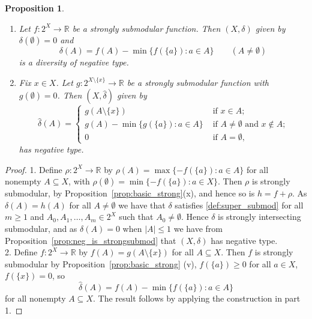 \documentclass{article}
\theoremstyle{plain}
\newtheorem{proposition}[theorem]{Proposition}
\theoremstyle{definition}
\newcommand{\whd}{\widehat{\delta}}
\renewcommand{\Re}{\mathbb{R}}
\begin{document}
\begin{proposition} \label{prop:extend_strong}
\begin{enumerate}
\item Let $f:2^X \rightarrow \Re$ be a strongly submodular function. Then $(X,\delta)$ given by $\delta(\emptyset) = 0$ and 
\[\delta(A) = f(A) - \min\{f(\{a\}): a \in A \} \quad \quad (A \neq \emptyset)\]
is a diversity of negative type.
\item Fix $x \in X$. Let $g:2^{X \setminus \{x\}} \rightarrow \Re$ be a strongly submodular function with $g(\emptyset) = 0$. Then $(X,\whd)$ given by 
\[
\whd(A) = \begin{cases} g(A \setminus \{x\}) & \mbox{ if $x \in A$;} \\
g(A) - \min\{g(\{a\}):a \in A\} & \mbox{ if $A \neq \emptyset$ and $x \not \in A$;} \\
0 & \mbox{ if $A = \emptyset$,} \end{cases}
\]
has negative type.
\end{enumerate}
\end{proposition}
\begin{proof}
1.  Define $\rho:2^X \rightarrow \Re$ by $\rho(A) = \max\{-f(\{a\}): a \in A\}$ for all nonempty $A \subseteq X$, with $\rho(\emptyset) = \min\{-f(\{a\}):a \in  X\}$. Then $\rho$ is strongly submodular, by Proposition~\ref{prop:basic_strong}(x), and hence so is $h = f + \rho$. As $\delta(A) = h(A)$ for all $A \neq \emptyset$ we have that $\delta$  satisfies \eqref{def:super_submod} for all $m \geq 1$ and $A_0,A_1,\ldots,A_m \in 2^X$ such that $A_0 \neq \emptyset$. Hence $\delta$ is strongly intersecting submodular, and as $\delta(A)  = 0$ when $|A| \leq 1$ we have from Proposition~\ref{prop:neg_is_strongsubmod} that $(X,\delta)$ has negative type.  \\
2. Define $f:2^X \rightarrow \Re$ by $f(A) = g(A \setminus \{x\})$ for all $A \subseteq X$. Then $f$ is strongly submodular by Proposition~\ref{prop:basic_strong} (v), $f(\{a\}) \geq 0$ for all $a \in X$, $f(\{x\}) = 0$, so 
\[\whd(A) = f(A) - \min\{f(\{a\}): a \in A \}\]
for all nonempty $A \subseteq X$. The result follows by applying the construction in part 1.
\end{proof}
\end{document}
